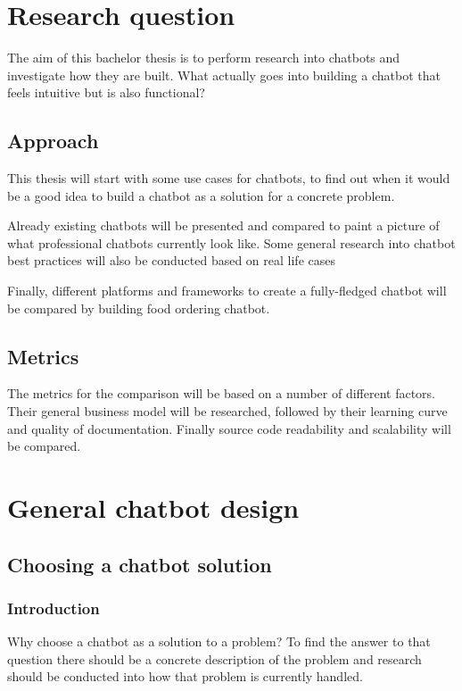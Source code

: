 \chapter{Research question}

The aim of this bachelor thesis is to perform research into chatbots and investigate how they are built. What actually goes into building a chatbot that feels intuitive but is also functional?

\section{Approach}

This thesis will start with some use cases for chatbots, to find out when it would be a good idea to build a chatbot as a solution for a concrete problem.

Already existing chatbots will be presented and compared to paint a picture of what professional chatbots currently look like.
Some general research into chatbot best practices will also be conducted based on real life cases

Finally, different platforms and frameworks to create a fully-fledged chatbot will be compared by building food ordering chatbot.

\section{Metrics}

The metrics for the comparison will be based on a number of different factors. Their general business model will be researched, followed by their learning curve and quality of documentation. Finally source code readability and scalability will be compared.

\chapter{General chatbot design}

\section{Choosing a chatbot solution}

\subsection{Introduction}

Why choose a chatbot as a solution to a problem? To find the answer to that question there should be a concrete description of the problem and research should be conducted into how that problem is currently handled.

